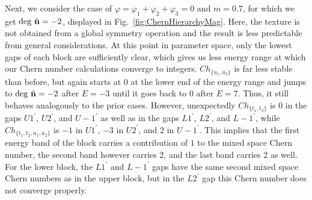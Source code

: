 \documentclass[submission, Phys]{SciPost}
\begin{document}
Next, we consider the case of $\varphi=\varphi_1+\varphi_2+\varphi_3=0$ and $m=0.7$, for which we get $\mathrm{deg}~\hat{\mathbf{n}}=-2$, displayed in Fig.~\ref{fig:ChernHierarchyMag}. Here, the texture is not obtained from a global symmetry operation and the result is less predictable from general considerations.
At this point in parameter space, only the lowest gaps of each block are sufficiently clear, which gives us less energy range at which our Chern number calculations converge to integers. 
$Ch_{\lbrace u_1, u_2 \rbrace }$ is far less stable than before, but again starts at $0$ at the lower end of the energy range and jumps to $\mathrm{deg}~\hat{\mathbf{n}}=-2$ after $E=-3$ until it goes back to $0$ after $E=7$. 
Thus, it still behaves analogously to the prior cases.
However, unexpectedly $Ch_{\lbrace t_1, t_2 \rbrace }$ is $0$ in the gaps $U1^{\prime}$, $U2^{\prime}$, and $U-1^{\prime}$ as well as in the gaps $L1^{\prime}$, $L2^{\prime}$, and $L-1^{\prime}$, while
$Ch_{\lbrace t_1, t_2, u_1, u_2 \rbrace }$ is $-1$ in $U1^{\prime}$, $-3$ in $U2^{\prime}$, and $2$ in $U-1^{\prime}$.
This implies that the first energy band of the block carries a contribution of $1$ to the mixed space Chern number, the second band however carries $2$, and the last band carries $2$ as well.
For the lower block, the $L1^{\prime}$ and $L-1^{\prime}$ gaps have the same second mixed space Chern numbers as in the upper block, but in the $L2^{\prime}$ gap this Chern number does not converge properly.

\figureIX
\end{document}
